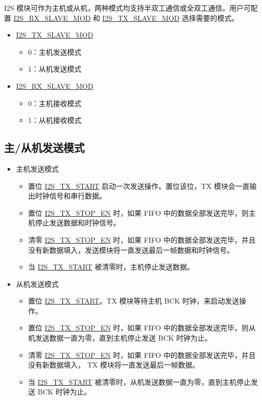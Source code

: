 \documentclass[main\_\_CN.tex]{subfiles}
\begin{document}
\chipname{} I2S 模块可作为主机或从机，两种模式均支持半双工通信或全双工通信。用户可配置  \hyperref[fielddesc:I2SRXSLAVEMOD]{I2S\_RX\_SLAVE\_MOD} 和 \hyperref[fielddesc:I2STXSLAVEMOD]{I2S\_TX\_SLAVE\_MOD} 选择需要的模式。

\begin{itemize}
    \item \hyperref[fielddesc:I2STXSLAVEMOD]{I2S\_TX\_SLAVE\_MOD} 
    \begin{itemize}
        \item 0：主机发送模式
        \item 1：从机发送模式
    \end{itemize}
    \item \hyperref[fielddesc:I2SRXSLAVEMOD]{I2S\_RX\_SLAVE\_MOD}
    \begin{itemize}
        \item 0：主机接收模式
        \item 1：从机接收模式
    \end{itemize}
\end{itemize}

\subsection{主/从机发送模式} \label{sec:i2s-master-slave-tx-mode}
\begin{itemize}
    \item 主机发送模式
    \begin{itemize}
        \item 置位 \hyperref[fielddesc:I2STXSTART]{I2S\_TX\_START} 启动一次发送操作。置位该位，TX 模块会一直输出时钟信号和串行数据。
        \item 置位 \hyperref[fielddesc:I2STXSTOPEN]{I2S\_TX\_STOP\_EN} 时，如果 FIFO 中的数据全部发送完毕，则主机停止发送数据和时钟信号。
        \item 清零 \hyperref[fielddesc:I2STXSTOPEN]{I2S\_TX\_STOP\_EN} 时，如果 FIFO 中的数据全部发送完毕，并且没有新数据填入，发送模块将一直发送最后一帧数据和时钟信号。
        \item 当 \hyperref[fielddesc:I2STXSTART]{I2S\_TX\_START} 被清零时，主机停止发送数据。
    \end{itemize}
    \item 从机发送模式
    \begin{itemize}
        \item 置位 \hyperref[fielddesc:I2STXSTART]{I2S\_TX\_START}。TX 模块等待主机 BCK 时钟，来启动发送操作。
        \item 置位 \hyperref[fielddesc:I2STXSTOPEN]{I2S\_TX\_STOP\_EN} 时，如果 FIFO 中的数据全部发送完毕，则从机发送数据一直为零，直到主机停止发送 BCK 时钟为止。
        \item 清零 \hyperref[fielddesc:I2STXSTOPEN]{I2S\_TX\_STOP\_EN} 时，如果 FIFO 中的数据全部发送完毕，并且没有新数据填入， TX 模块将一直发送最后一帧数据。
        \item 当 \hyperref[fielddesc:I2STXSTART]{I2S\_TX\_START} 被清零时，从机发送数据一直为零，直到主机停止发送 BCK 时钟为止。
    \end{itemize}
\end{itemize}
\end{document}
